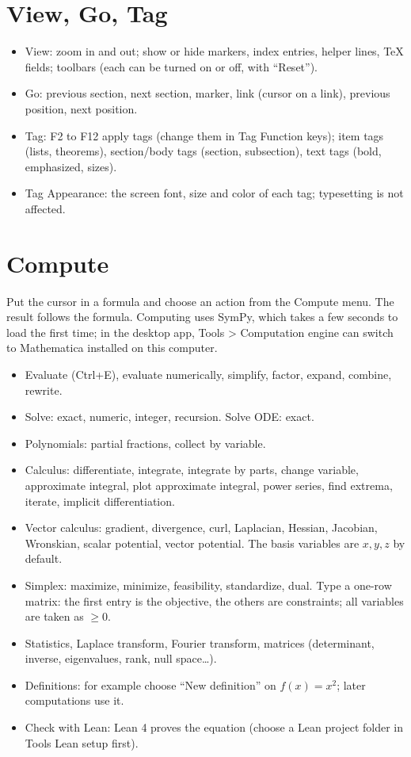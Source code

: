 \section{View, Go, Tag}

\begin{itemize}
\item View: zoom in and out; show or hide markers, index entries, helper lines, TeX fields; toolbars (each can be turned on or off, with ``Reset'').
\item Go: previous section, next section, marker, link (cursor on a link), previous position, next position.
\item Tag: F2 to F12 apply tags (change them in Tag \TEXTsymbol{>} Function keys); item tags (lists, theorems), section/body tags (section, subsection), text tags (bold, emphasized, sizes).
\item Tag \TEXTsymbol{>} Appearance: the screen font, size and color of each tag; typesetting is not affected.
\end{itemize}

\section{Compute}

Put the cursor in a formula and choose an action from the Compute menu. The result follows the formula. Computing uses SymPy, which takes a few seconds to load the first time; in the desktop app, Tools > Computation engine can switch to Mathematica installed on this computer.

\begin{itemize}
\item Evaluate (Ctrl+E), evaluate numerically, simplify, factor, expand, combine, rewrite.
\item Solve: exact, numeric, integer, recursion. Solve ODE: exact.
\item Polynomials: partial fractions, collect by variable.
\item Calculus: differentiate, integrate, integrate by parts, change variable, approximate integral, plot approximate integral, power series, find extrema, iterate, implicit differentiation.
\item Vector calculus: gradient, divergence, curl, Laplacian, Hessian, Jacobian, Wronskian, scalar potential, vector potential. The basis variables are $x,y,z$ by default.
\item Simplex: maximize, minimize, feasibility, standardize, dual. Type a one-row matrix: the first entry is the objective, the others are constraints; all variables are taken as $\geq 0$.
\item Statistics, Laplace transform, Fourier transform, matrices (determinant, inverse, eigenvalues, rank, null space…).
\item Definitions: for example choose ``New definition'' on $f(x)=x^{2}$; later computations use it.
\item Check with Lean: Lean 4 proves the equation (choose a Lean project folder in Tools \TEXTsymbol{>} Lean setup first).
\end{itemize}

